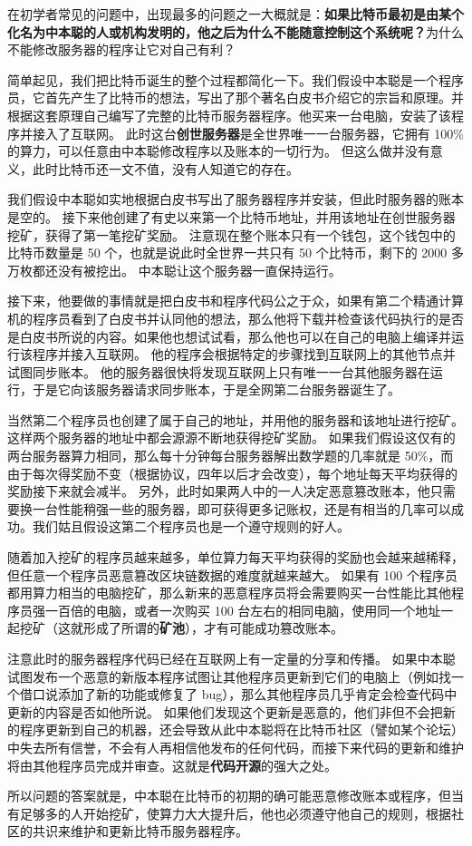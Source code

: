 在初学者常见的问题中，出现最多的问题之一大概就是：\textbf{如果比特币最初是由某个化名为中本聪的人或机构发明的，他之后为什么不能随意控制这个系统呢？}为什么不能修改服务器的程序让它对自己有利？

简单起见，我们把比特币诞生的整个过程都简化一下。我们假设中本聪是一个程序员，它首先产生了比特币的想法，写出了那个著名白皮书介绍它的宗旨和原理。并根据这套原理自己编写了完整的比特币服务器程序。他买来一台电脑，安装了该程序并接入了互联网。 此时这台\textbf{创世服务器}是全世界唯一一台服务器，它拥有 100\% 的算力，可以任意由中本聪修改程序以及账本的一切行为。 但这么做并没有意义，此时比特币还一文不值，没有人知道它的存在。

我们假设中本聪如实地根据白皮书写出了服务器程序并安装，但此时服务器的账本是空的。 接下来他创建了有史以来第一个比特币地址，并用该地址在创世服务器挖矿，获得了第一笔挖矿奖励。 注意现在整个账本只有一个钱包，这个钱包中的比特币数量是 50 个，也就是说此时全世界一共只有 50 个比特币，剩下的 2000 多万枚都还没有被挖出。 中本聪让这个服务器一直保持运行。

接下来，他要做的事情就是把白皮书和程序代码公之于众，如果有第二个精通计算机的程序员看到了白皮书并认同他的想法，那么他将下载并检查该代码执行的是否是白皮书所说的内容。如果他也想试试看，那么他也可以在自己的电脑上编译并运行该程序并接入互联网。 他的程序会根据特定的步骤找到互联网上的其他节点并试图同步账本。 他的服务器很快将发现互联网上只有唯一一台其他服务器在运行，于是它向该服务器请求同步账本，于是全网第二台服务器诞生了。

当然第二个程序员也创建了属于自己的地址，并用他的服务器和该地址进行挖矿。这样两个服务器的地址中都会源源不断地获得挖矿奖励。 如果我们假设这仅有的两台服务器算力相同，那么每十分钟每台服务器解出数学题的几率就是 50\%，而由于每次得奖励不变（根据协议，四年以后才会改变），每个地址每天平均获得的奖励接下来就会减半。 另外，此时如果两人中的一人决定恶意篡改账本，他只需要换一台性能稍强一些的服务器，即可获得更多记账权，还是有相当的几率可以成功。我们姑且假设这第二个程序员也是一个遵守规则的好人。

随着加入挖矿的程序员越来越多，单位算力每天平均获得的奖励也会越来越稀释，但任意一个程序员恶意篡改区块链数据的难度就越来越大。 如果有 100 个程序员都用算力相当的电脑挖矿，那么新来的恶意程序员将会需要购买一台性能比其他程序员强一百倍的电脑，或者一次购买 100 台左右的相同电脑，使用同一个地址一起挖矿（这就形成了所谓的\textbf{矿池}），才有可能成功篡改账本。

注意此时的服务器程序代码已经在互联网上有一定量的分享和传播。 如果中本聪试图发布一个恶意的新版本程序试图让其他程序员更新到它们的电脑上（例如找一个借口说添加了新的功能或修复了 bug），那么其他程序员几乎肯定会检查代码中更新的内容是否如他所说。 如果他们发现这个更新是恶意的，他们非但不会把新的程序更新到自己的机器，还会导致从此中本聪将在比特币社区（譬如某个论坛）中失去所有信誉，不会有人再相信他发布的任何代码，而接下来代码的更新和维护将由其他程序员完成并审查。这就是\textbf{代码开源}的强大之处。

所以问题的答案就是，中本聪在比特币的初期的确可能恶意修改账本或程序，但当有足够多的人开始挖矿，使算力大大提升后，他也必须遵守他自己的规则，根据社区的共识来维护和更新比特币服务器程序。

